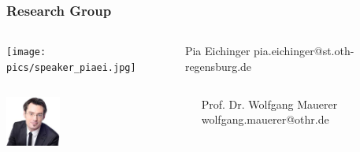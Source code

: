 \documentclass{beamer}
\begin{document}
	\begin{frame}
	\frametitle{Research Group}
	\begin{minipage}[c]{1.0\linewidth}
		\begin{columns}
		\begin{column}{0.35\textwidth}
			\begin{center}
     		\texttt{[image: pics/speaker\_piaei.jpg]}
			\end{center}
		\end{column}
		\begin{column}{0.7\textwidth}
		\begin{block}{Pia Eichinger}
			pia.eichinger@st.oth-regensburg.de
		\end{block}
		\end{column}
		\end{columns}

	\end{minipage}
	\begin{minipage}[c]{1.0\linewidth}
		\begin{columns}
		\begin{column}{0.35\textwidth}
			\begin{center}
     		\includegraphics[width=0.3\textwidth]{pics/speakers_mauerer.jpeg}
			\end{center}
		\end{column}
		\begin{column}{0.7\textwidth}
		\begin{block}{Prof. Dr. Wolfgang Mauerer}
			wolfgang.mauerer@othr.de
		\end{block}
		\end{column}
		\end{columns}


\end{minipage}
\end{frame}
\end{document}
